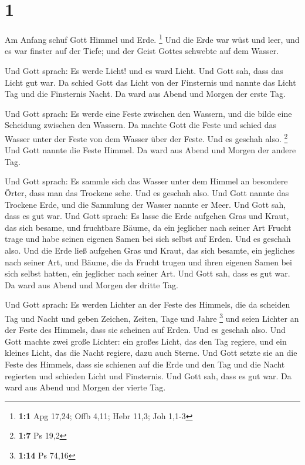 \hypertarget{section}{%
\section{1}\label{section}}

 Am Anfang schuf Gott Himmel und Erde. \footnote{\textbf{1:1}
  Apg 17,24; Offb 4,11; Hebr 11,3; Joh 1,1-3}  Und die
Erde war wüst und leer, und es war finster auf der Tiefe; und der Geist
Gottes schwebte auf dem Wasser.

 Und Gott sprach: Es werde Licht! und es ward Licht.
 Und Gott sah, dass das Licht gut war. Da schied Gott das
Licht von der Finsternis  und nannte das Licht Tag und die
Finsternis Nacht. Da ward aus Abend und Morgen der erste Tag.

 Und Gott sprach: Es werde eine Feste zwischen den
Wassern, und die bilde eine Scheidung zwischen den Wassern.
 Da machte Gott die Feste und schied das Wasser unter der
Feste von dem Wasser über der Feste. Und es geschah also. \footnote{\textbf{1:7}
  Ps 19,2}  Und Gott nannte die Feste Himmel. Da ward aus
Abend und Morgen der andere Tag.

 Und Gott sprach: Es sammle sich das Wasser unter dem
Himmel an besondere Örter, dass man das Trockene sehe. Und es geschah
also.  Und Gott nannte das Trockene Erde, und die
Sammlung der Wasser nannte er Meer. Und Gott sah, dass es gut war.
 Und Gott sprach: Es lasse die Erde aufgehen Gras und
Kraut, das sich besame, und fruchtbare Bäume, da ein jeglicher nach
seiner Art Frucht trage und habe seinen eigenen Samen bei sich selbst
auf Erden. Und es geschah also.  Und die Erde ließ
aufgehen Gras und Kraut, das sich besamte, ein jegliches nach seiner
Art, und Bäume, die da Frucht trugen und ihren eigenen Samen bei sich
selbst hatten, ein jeglicher nach seiner Art. Und Gott sah, dass es gut
war.  Da ward aus Abend und Morgen der dritte Tag.

 Und Gott sprach: Es werden Lichter an der Feste des
Himmels, die da scheiden Tag und Nacht und geben Zeichen, Zeiten, Tage
und Jahre \footnote{\textbf{1:14} Ps 74,16}  und seien
Lichter an der Feste des Himmels, dass sie scheinen auf Erden. Und es
geschah also.  Und Gott machte zwei große Lichter: ein
großes Licht, das den Tag regiere, und ein kleines Licht, das die Nacht
regiere, dazu auch Sterne.  Und Gott setzte sie an die
Feste des Himmels, dass sie schienen auf die Erde  und
den Tag und die Nacht regierten und schieden Licht und Finsternis. Und
Gott sah, dass es gut war.  Da ward aus Abend und Morgen
der vierte Tag.

